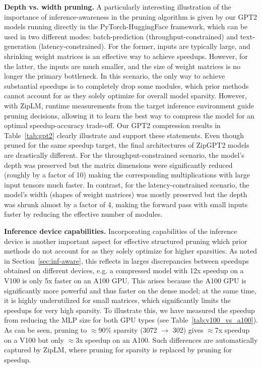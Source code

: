 \documentclass{article}
\theoremstyle{plain}
\theoremstyle{definition}
\theoremstyle{remark}
\renewcommand{\paragraph}[1]{ \noindent \textbf{#1}}
\begin{document}
\paragraph{Depth vs. width pruning.} A particularly interesting illustration of the importance of inference-awareness in the pruning algorithm is given by our GPT2 models running directly in the \mbox{PyTorch-HuggingFace} framework, which can be used in two different modes: batch-prediction (throughput-constrained) and text-generation (latency-constrained). For the former, inputs are typically large, and shrinking weight matrices is an effective way to achieve speedups. However, for the latter, the inputs are much smaller, and the size of weight matrices is no longer the primary bottleneck. In this scenario, the only way to achieve substantial speedups is to completely drop some modules, which prior methods cannot account for as they solely optimize for overall model sparsity. However, with ZipLM, runtime measurements from the target inference environment guide pruning decisions, allowing it to learn the best way to compress the model for an optimal speedup-accuracy trade-off.
Our GPT2 compression results in Table~\ref{tab:gpt2} clearly illustrate and support these statements. Even though pruned for the same speedup target, the final architectures of ZipGPT2 models are  drastically different. For the throughput-constrained scenario, the model’s depth was preserved but the matrix dimensions were significantly reduced (roughly by a factor of 10) making the corresponding multiplications with large input tensors much faster. In contrast, for the latency-constrained scenario, the model’s width (shapes of weight matrices) was mostly preserved but the depth was shrunk almost by a factor of 4, making the forward pass with small inputs faster by reducing the effective number of modules.

\paragraph{Inference device capabilities.} Incorporating capabilities of the inference device is another important aspect for effective structured pruning which prior methods do not account for as they solely optimize for higher sparsities. As noted in Section~\ref{sec:inf-aware}, this reflects in larges discrepancies between speedups obtained on different devices, e.g. a compressed model with 12x speedup on a V100 is only 5x faster on an A100 GPU. This arises because the A100 GPU is significantly more powerful and thus faster on the dense model; at the same time, it is highly underutilized for small matrices, which significantly limits the speedups for very high sparsity. To illustrate this, we have measured the speedup from reducing the MLP size for both GPU types (see Table~\ref{tab:v100_vs_a100}). As can be seen, pruning to $\approx$90\% sparsity (3072 $\rightarrow$ 302) gives $\approx$7x speedup on a V100 but only $\approx$3x speedup on an A100. Such differences are automatically captured by ZipLM, where pruning for sparsity is replaced by pruning for speedup.
\end{document}
